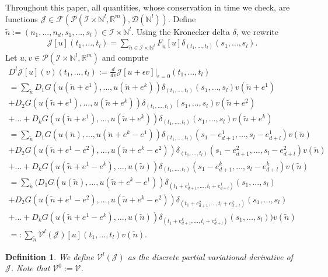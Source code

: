 \documentclass[sigconf,twocolumn]{acmart}
\newcommand{\Rr}{{\mathbb{R}}}
\newcommand{\Nn}{{\mathbb{N}}}
\newcommand{\1}{{\chi}}
\newcommand{\Ii}{{\mathcal{I}}}
\numberwithin{equation}{section}
\theoremstyle{thmlemcorr}
\numberwithin{theorem}{section}
\theoremstyle{thmlemcorr*}
\theoremstyle{defi}
\newtheorem{definition}[theorem]{Definition}
\theoremstyle{remexample}
\theoremstyle{ass}
\begin{document}
Throughout this paper, all quantities, whose conservation in time we check, are functions $\mathcal{J}\in\mathcal{F}(\mathcal{P}(\Ii\times\Nn^l,\Rr^m),\mathcal{D}(\Nn^l))$. 
Define $\tilde{n}:=(n_1,...,n_d,s_1,...,s_l)\in\Ii\times\Nn^l$. Using the Kronecker delta $\delta$, we rewrite
\begin{gather*}
	\mathcal{J}[u](t_1,\ldots,t_{l})
	=\sum_{\tilde{n}\in\Ii\times\Nn^l}F_{\tilde{n}}[u]\delta_{(t_1,\ldots,t_{l})}(s_1,\ldots,s_l).
\end{gather*}
	Let $u,v\in\mathcal{P}(\Ii\times\Nn^l,\Rr^m)$ and compute
	\footnotesize
	\begin{gather*}
		D^l\mathcal{J}[u](v)(t_1,\ldots,t_{l}):=\frac{d}{d\epsilon}\mathcal{J}[u+\epsilon v]\Big|_{\epsilon=0}(t_1,\ldots,t_{l})\\
		=\sum_{\tilde{n}}D_1G(u(\tilde{n}+e^1),\ldots,u(\tilde{n}+e^k))\delta_{(t_1,\ldots,t_{l})}(s_1,\ldots,s_l)v(\tilde{n}+e^1)\\
		+D_2G(u(\tilde{n}+e^1),\ldots,u(\tilde{n}+e^k))\delta_{(t_1,\ldots,t_{l})}(s_1,\ldots,s_l)v(\tilde{n}+e^2)\\+\ldots
		+D_kG(u(\tilde{n}+e^1),\ldots,u(\tilde{n}+e^k))\delta_{(t_1,\ldots,t_{l})}(s_1,\ldots,s_l)v(\tilde{n}+e^k)\\
		=\sum_{\tilde{n}}D_1G(u(\tilde{n}),\ldots,u(\tilde{n}+e^k-e^1))\delta_{(t_1,\ldots,t_{l})}(s_1-e^1_{d+1},\ldots,s_l-e^1_{d+l})v(\tilde{n})\\
		+D_2G(u(\tilde{n}+e^1-e^2),\ldots,u(\tilde{n}+e^k-e^2))\delta_{(t_1,\ldots,t_{l})}(s_1-e^2_{d+1},\ldots,s_l-e^2_{d+l})v(\tilde{n})\\+\ldots
		+D_kG(u(\tilde{n}+e^1-e^k),\ldots,u(\tilde{n}))\delta_{(t_1,\ldots,t_{l})}(s_1-e^k_{d+1},\ldots,s_l-e^k_{d+l})v(\tilde{n})\\
		=\sum_{\tilde{n}}\Big(D_1G(u(\tilde{n}),\ldots,u(\tilde{n}+e^k-e^1))\delta_{(t_1+e^1_{d+1},\ldots,t_{l}+e^1_{d+l})}(s_1,\ldots,s_l)\\
		+D_2G(u(\tilde{n}+e^1-e^2),\ldots,u(\tilde{n}+e^k-e^2))\delta_{(t_1+e^2_{d+1},\ldots,t_{l}+e^2_{d+l})}(s_1,\ldots,s_l)\\+\ldots
		+D_kG(u(\tilde{n}+e^1-e^k),\ldots,u(\tilde{n}))\delta_{(t_1+e^k_{d+1},\ldots,t_{l}+e^k_{d+l})}(s_1,\ldots,s_l)\Big)v(\tilde{n})\\
		=:\sum_{\tilde{n}}\mathcal{V}^l(\mathcal{J})[u](t_1,\ldots,t_{l})v(\tilde{n}).
	\end{gather*}
	\normalsize
	\begin{definition}
	We define $\mathcal{V}^l(\mathcal{J})$ as the discrete partial variational derivative of $\mathcal{J}$.
	Note that $\mathcal{V}^0:=\mathcal{V}$.
\end{definition}
\end{document}
